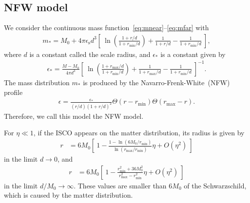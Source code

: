 \documentclass[aps,11pt,nofootinbib,preprintnumbers,groupedaddress,superscriptaddress]{revtex4-2}
\begin{document}
\subsection{NFW model}
We consider the continuous mass function~\eqref{eq:mnear}--\eqref{eq:mfar} with
\begin{align}
m_*=M_0+4\pi \epsilon_{\mathrm{s}} d^3 \left[\:\!
\ln \left(
\frac{1+r/d}{1+r_{\mathrm{min}}/d}
\right)
+\frac{1}{1+r/d}-\frac{1}{1+r_{\mathrm{min}}/d}\:\!\right],
\end{align}
where $d$ is a constant called the scale radius, 
and $\epsilon_*$ is a constant given by
\begin{align}
\epsilon_* =\frac{M-M_0}{4\pi d^3}\left[\:\!
\ln \left(
\frac{1+r_{\mathrm{max}}/d}{1+r_{\mathrm{min}}/d}
\right)
+\frac{1}{1+r_{\mathrm{max}}/d}
-\frac{1}{1+r_{\mathrm{min}}/d}
\:\!\right]^{-1}.
\end{align}
The mass distribution $m_*$ is produced by the 
Navarro-Frenk-White~(NFW) profile~\cite{Navarro:1995iw}
\begin{align}
\epsilon =\frac{\epsilon_*}{(r/d)(1+r/d)^2}
\Theta(r-r_{\mathrm{min}})\Theta(r_{\mathrm{max}}-r).
\end{align}
Therefore, we call this model the NFW model.


For $\eta\ll 1$, if the ISCO appears on the matter distribution, its radius is given by
\begin{align}
r&=6M_0 \left[\:\!
1-\frac{1-\ln (6M_0/r_{\mathrm{min}})}{\ln (r_{\mathrm{max}}/r_{\mathrm{min}})} 
\eta
+O(\eta^2)
\:\!\right]
\end{align}
in the limit $d\to 0$, and 
\begin{align}
r&=6M_0 \left[\:\!
1-\frac{r_{\mathrm{min}}^2+36 M_0^2}{r_{\mathrm{max}}^2-r_{\mathrm{min}}^2}
\eta+O(\eta^2)
\:\!\right]
\end{align}
in the limit $d/M_0\to \infty$.
These values are smaller than $6M_0$ of the Schwarzschild, which is caused by the matter distribution.
\end{document}
